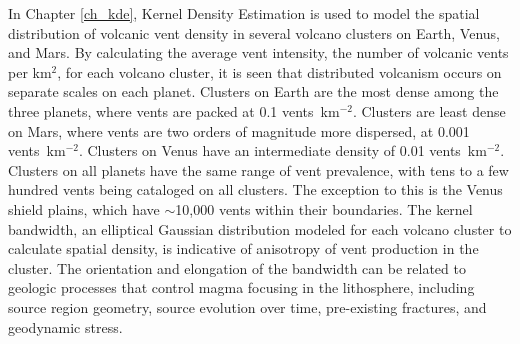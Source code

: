 In Chapter \ref{ch_kde}, Kernel Density Estimation is used to model the spatial distribution of volcanic vent density in several volcano clusters on Earth, Venus, and Mars. By calculating the average vent intensity, the number of volcanic vents per km$^2$, for each volcano cluster, it is seen that distributed volcanism occurs on separate scales on each planet. Clusters on Earth are the most dense among the three planets, where vents are packed at 0.1 vents~km$^{-2}$. Clusters are least dense on Mars, where vents are two orders of magnitude more dispersed, at 0.001 vents~km$^{-2}$. Clusters on Venus have an intermediate density of 0.01 vents~km$^{-2}$. Clusters on all planets have the same range of vent prevalence, with tens to a few hundred vents being cataloged on all clusters. The exception to this is the Venus shield plains, which have $\sim$10,000 vents within their boundaries. The kernel bandwidth, an elliptical Gaussian distribution modeled for each volcano cluster to calculate spatial density, is indicative of anisotropy of vent production in the cluster. The orientation and elongation of the bandwidth can be related to geologic processes that control magma focusing in the lithosphere, including source region geometry, source evolution over time, pre-existing fractures, and geodynamic stress.


 
